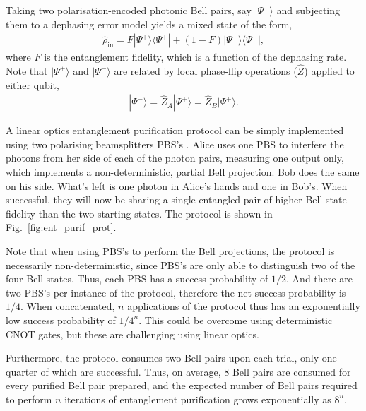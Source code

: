 \documentclass[aps,rmp,twocolumn,amsmath,amssymb,nofootinbib,superscriptaddress]{revtex4}
\newcommand{\bra}[1]{\langle#1|}
\newcommand{\ket}[1]{|#1\rangle}
\begin{document}
Taking two polarisation-encoded photonic Bell pairs, say $\ket{\Psi^+}$ and subjecting them to a dephasing error model yields a mixed state of the form,
\begin{align}
\hat\rho_\mathrm{in} = F\ket{\Psi^+}\bra{\Psi^+} + (1-F)\ket{\Psi^-}\bra{\Psi^-},
\end{align}
where $F$ is the entanglement fidelity, which is a function of the dephasing rate. Note that $\ket{\Psi^+}$ and $\ket{\Psi^-}$ are related by local phase-flip operations ($\hat{Z}$) applied to either qubit,
\begin{align} \label{eq:bell_basis}
\ket{\Psi^-} = \hat{Z}_A \ket{\Psi^+} = \hat{Z}_B \ket{\Psi^+}.
\end{align}

A linear optics entanglement purification protocol can be simply implemented using two polarising beamsplitters PBS's \cite{???}. Alice uses one PBS to interfere the photons from her side of each of the photon pairs, measuring one output only, which implements a non-deterministic, partial Bell projection. Bob does the same on his side. What's left is one photon in Alice's hands and one in Bob's. When successful, they will now be sharing a single entangled pair of higher Bell state fidelity than the two starting states. The protocol is shown in Fig.~\ref{fig:ent_purif_prot}.

Note that when using PBS's to perform the Bell projections, the protocol is necessarily non-deterministic, since PBS's are only able to distinguish two of the four Bell states. Thus, each PBS has a success probability of $1/2$. And there are two PBS's per instance of the protocol, therefore the net success probability is $1/4$. When concatenated, $n$ applications of the protocol thus has an exponentially low success probability of $1/4^n$. This could be overcome using deterministic CNOT gates, but these are challenging using linear optics.

Furthermore, the protocol consumes two Bell pairs upon each trial, only one quarter of which are successful. Thus, on average, 8 Bell pairs are consumed for every purified Bell pair prepared, and the expected number of Bell pairs required to perform $n$ iterations of entanglement purification grows exponentially as $8^n$.
\end{document}

